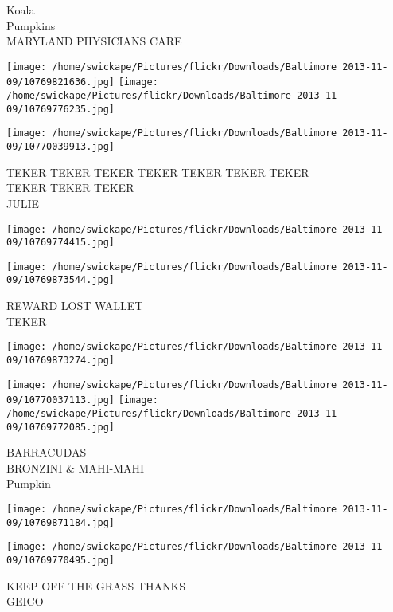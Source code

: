 \documentclass[10pt,letterpaper]{article}
\begin{document}
Koala\\
Pumpkins\\
MARYLAND PHYSICIANS CARE\\
\pagebreak

\texttt{[image: /home/swickape/Pictures/flickr/Downloads/Baltimore 2013-11-09/10769821636.jpg]}
\texttt{[image: /home/swickape/Pictures/flickr/Downloads/Baltimore 2013-11-09/10769776235.jpg]}

\vspace{0.25in}
\texttt{[image: /home/swickape/Pictures/flickr/Downloads/Baltimore 2013-11-09/10770039913.jpg]}

TEKER TEKER TEKER TEKER TEKER TEKER TEKER\\
TEKER TEKER TEKER\\
JULIE\\
\pagebreak

\texttt{[image: /home/swickape/Pictures/flickr/Downloads/Baltimore 2013-11-09/10769774415.jpg]}

\vspace{0.25in}
\texttt{[image: /home/swickape/Pictures/flickr/Downloads/Baltimore 2013-11-09/10769873544.jpg]}

REWARD LOST WALLET\\
TEKER\\
\pagebreak

\texttt{[image: /home/swickape/Pictures/flickr/Downloads/Baltimore 2013-11-09/10769873274.jpg]}

\vspace{0.25in}
\texttt{[image: /home/swickape/Pictures/flickr/Downloads/Baltimore 2013-11-09/10770037113.jpg]}
\texttt{[image: /home/swickape/Pictures/flickr/Downloads/Baltimore 2013-11-09/10769772085.jpg]}

BARRACUDAS\\
BRONZINI \& MAHI{-}MAHI\\
Pumpkin\\
\pagebreak

\texttt{[image: /home/swickape/Pictures/flickr/Downloads/Baltimore 2013-11-09/10769871184.jpg]}

\vspace{0.25in}
\texttt{[image: /home/swickape/Pictures/flickr/Downloads/Baltimore 2013-11-09/10769770495.jpg]}

KEEP OFF THE GRASS THANKS\\
GEICO\\
\pagebreak
\end{document}
